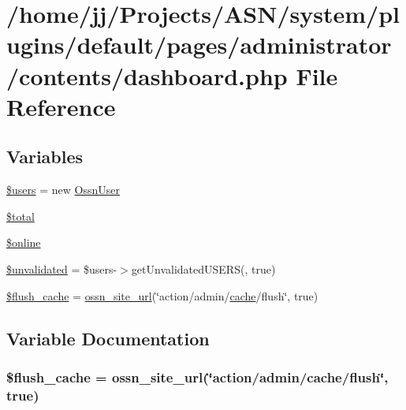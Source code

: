 \hypertarget{dashboard_8php}{}\section{/home/jj/\+Projects/\+A\+S\+N/system/plugins/default/pages/administrator/contents/dashboard.php File Reference}
\label{dashboard_8php}
\subsection*{Variables}
\begin{DoxyCompactItemize}
\item 
\hyperlink{dashboard_8php_a28005d22fa7ef2dfe215ad886b497d9c}{\$users} = new \hyperlink{class_ossn_user}{Ossn\+User}
\item 
\hyperlink{dashboard_8php_a241b818f48030b628685b2e5119c5624}{\$total}
\item 
\hyperlink{dashboard_8php_aceed569b975741ac6ce4f2f902bf3a06}{\$online}
\item 
\hyperlink{dashboard_8php_a77236cfffbde4d32b3f69cd4f5ed518d}{\$unvalidated} = \$users-\/$>$get\+Unvalidated\+U\+S\+E\+RS(\textquotesingle{}\textquotesingle{}, true)
\item 
\hyperlink{dashboard_8php_a2abcd95c5ba67818f177edcacc5d6d50}{\$flush\+\_\+cache} = \hyperlink{ossn_8lib_8system_8php_a2f12f9244f99eccd1225afb76ef2ab65}{ossn\+\_\+site\+\_\+url}(\char`\"{}action/admin/\hyperlink{jquery_8tokeninput_8js_a521016aa0ca9ff38bfba60ab069cb34b}{cache}/flush\char`\"{}, true)
\end{DoxyCompactItemize}


\subsection{Variable Documentation}
\subsubsection[{\texorpdfstring{\$flush\+\_\+cache}{$flush_cache}}]{\setlength{\rightskip}{0pt plus 5cm}\$flush\+\_\+cache = {\bf ossn\+\_\+site\+\_\+url}(\char`\"{}action/admin/{\bf cache}/flush\char`\"{}, true)}\hypertarget{dashboard_8php_a2abcd95c5ba67818f177edcacc5d6d50}{}\label{dashboard_8php_a2abcd95c5ba67818f177edcacc5d6d50}


